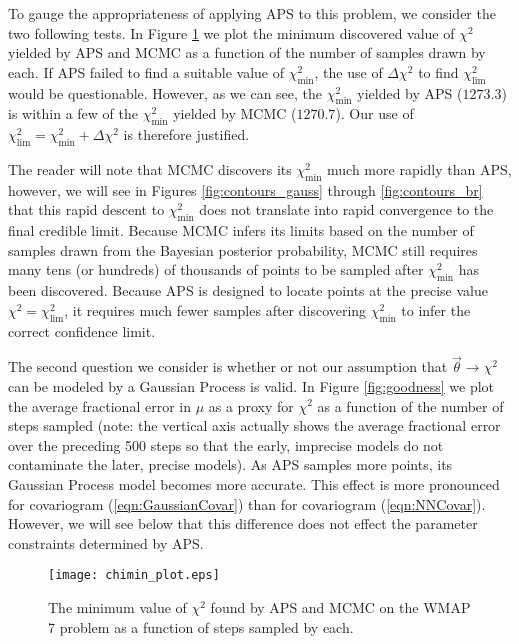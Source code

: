 \documentclass[useAMS,usenatbib]{aastex}
\begin{document}
To gauge the appropriateness of applying APS to this problem, we consider
the two following tests.  In Figure \ref{fig:chimin} we plot the minimum discovered value
of $\chi^2$ yielded by APS and MCMC as a function of the number of samples drawn
by each.  If APS failed to find a suitable value of $\chi^2_\text{min}$, the use of
$\Delta\chi^2$  to find $\chi^2_\text{lim}$ would be questionable.  However, as we can see,
the $\chi^2_\text{min}$ yielded by APS ($1273.3$) 
is within a few of the $\chi^2_\text{min}$ yielded
by MCMC ($1270.7$).  Our use of $\chi^2_\text{lim}=\chi^2_\text{min}+\Delta\chi^2$ is therefore
justified.

The reader will note that
MCMC discovers its $\chi^2_\text{min}$ much more rapidly than APS, however, 
we will see
in Figures \ref{fig:contours_gauss} through \ref{fig:contours_br} that this rapid
descent to $\chi^2_\text{min}$ does not translate into rapid convergence to
the final credible limit.  Because MCMC infers its limits based on the number
of samples drawn from the Bayesian posterior probability, MCMC still requires
many tens (or hundreds) of thousands of points to be sampled after $\chi^2_\text{min}$
has been discovered.  Because APS is designed to locate points at the precise value
$\chi^2=\chi^2_\text{lim}$, it requires much fewer samples after discovering 
$\chi^2_\text{min}$ to infer the correct confidence limit.

The second question we consider is whether or not our assumption that
$\vec{\theta}\rightarrow\chi^2$ can be modeled by a Gaussian Process is 
valid.  In Figure
\ref{fig:goodness} we plot the average fractional error in $\mu$ as a proxy for $\chi^2$ as a
function of the number of steps sampled (note: the vertical axis actually shows the average
fractional error over the preceding 500 steps so that the early, imprecise models do not
contaminate the later, precise models).  As APS samples more points, its Gaussian Process
model becomes more accurate.  This effect is more pronounced for covariogram (\ref{eqn:GaussianCovar})
than for covariogram (\ref{eqn:NNCovar}).  However, we will see below that this difference
does not effect the parameter constraints determined by APS.

\begin{figure}
\texttt{[image: chimin\_plot.eps]}
\caption{
The minimum value of $\chi^2$ found by APS and MCMC on the WMAP 7 problem
as a function of 
steps sampled by each.
}
\label{fig:chimin}
\end{figure}
\end{document}
